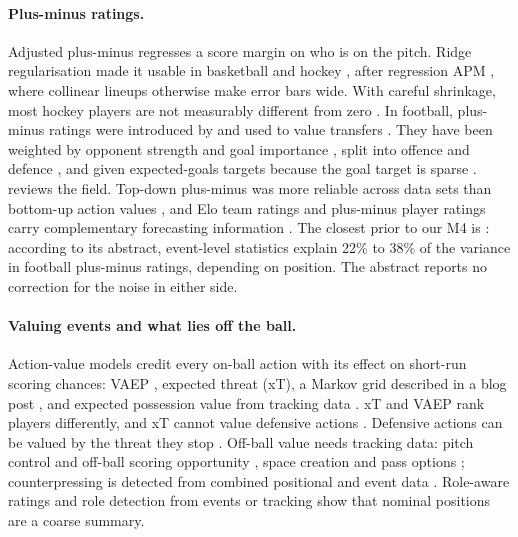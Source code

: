 \documentclass[11pt,a4paper]{article}
\begin{document}
\paragraph{Plus-minus ratings.}
Adjusted plus-minus regresses a score margin on who is on the pitch.
Ridge regularisation \citep{hoerl1970ridge} made it usable in basketball
\citep{sill2010rapm} and hockey \citep{macdonald2012ridge}, after regression
APM \citep{macdonald2011apm}, where collinear lineups otherwise make error bars
wide. With careful
shrinkage, most hockey players are not measurably different from zero
\citep{gramacy2013hockey}. In football, plus-minus ratings were introduced by
\citet{saebo2015transfer} and used to value transfers
\citep{saebo2019financial}. They have been weighted by opponent strength and
goal importance \citep{schultze2018weighted}, split into offence and defence
\citep{hvattum2020offdef}, and given expected-goals targets because the goal
target is sparse \citep{kharrat2020plusminus}. \citet{hvattum2019review}
reviews the field. Top-down plus-minus was more reliable across data sets
than bottom-up action values \citep{hvattum2021bottomup}, and Elo team ratings
and plus-minus player ratings carry complementary forecasting information
\citep{arntzen2021ratings}. The closest prior to our M4 is
\citet{gelade2020events}: according to its abstract, event-level statistics
explain 22\% to 38\% of the variance in football plus-minus ratings, depending
on position. The abstract reports no correction for the noise in either side.

\paragraph{Valuing events and what lies off the ball.}
Action-value models credit every on-ball action with its effect on short-run
scoring chances: VAEP \citep{decroos2019vaep}, expected threat (xT), a Markov
grid described in a blog post \citep{singh2019xt}, and expected possession
value from tracking data \citep{fernandez2019epv,fernandez2021epv}. xT and VAEP
rank players differently, and xT cannot value defensive actions
\citep{vanroy2020xtvaep}. Defensive actions can be valued by the threat they
stop \citep{merhej2021defensive}. Off-ball value needs tracking data: pitch
control and off-ball scoring opportunity \citep{spearman2018beyond}, space
creation \citep{fernandez2018wide} and pass options \citep{power2017passes};
counterpressing is detected from combined positional and event data
\citep{bauer2021counterpressing}. Role-aware ratings
\citep{pappalardo2019playerank} and role detection from events or tracking
\citep{aalbers2019roles,bialkowski2014roles} show that nominal positions are a
coarse summary.
\end{document}
